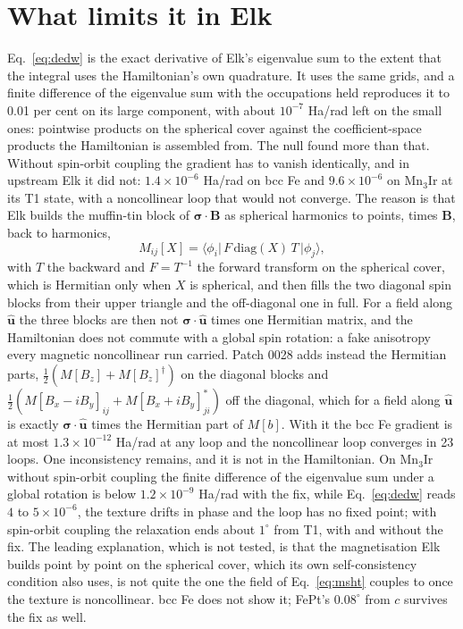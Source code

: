 \documentclass[11pt]{article}
\begin{document}
\section{What limits it in Elk}

Eq.~\eqref{eq:dedw} is the exact derivative of Elk's eigenvalue sum to the
extent that the integral uses the Hamiltonian's own quadrature. It uses the
same grids, and a finite difference of the eigenvalue sum with the occupations
held reproduces it to 0.01 per cent on its large component, with about
$10^{-7}$ Ha/rad left on the small ones: pointwise products on the spherical
cover against the coefficient-space products the Hamiltonian is assembled
from. The null found more than that. Without spin-orbit coupling the gradient
has to vanish identically, and in upstream Elk it did not: $1.4\times10^{-6}$
Ha/rad on bcc Fe and $9.6\times10^{-6}$ on Mn$_3$Ir at its T1 state, with a
noncollinear loop that would not converge. The reason is that Elk builds the
muffin-tin block of $\boldsymbol\sigma\cdot\mathbf B$ as spherical harmonics to
points, times $\mathbf B$, back to harmonics,
\begin{equation}
  M_{ij}[X]=\langle\phi_i|\,F\,\mathrm{diag}(X)\,T\,|\phi_j\rangle ,
  \label{eq:msht}
\end{equation}
with $T$ the backward and $F=T^{-1}$ the forward transform on the spherical
cover, which is Hermitian only when $X$ is spherical, and then fills the two
diagonal spin blocks from their upper triangle and the off-diagonal one in
full. For a field along $\hat{\mathbf u}$ the three blocks are then not
$\boldsymbol\sigma\cdot\hat{\mathbf u}$ times one Hermitian matrix, and the
Hamiltonian does not commute with a global spin rotation: a fake anisotropy
every magnetic noncollinear run carried. Patch 0028 adds instead the Hermitian
parts, $\tfrac12(M[B_z]+M[B_z]^\dagger)$ on the diagonal blocks and
$\tfrac12(M[B_x-iB_y]_{ij}+M[B_x+iB_y]_{ji}^*)$ off the diagonal, which for a
field along $\hat{\mathbf u}$ is exactly $\boldsymbol\sigma\cdot\hat{\mathbf u}$
times the Hermitian part of $M[b]$. With it the bcc Fe gradient is at most
$1.3\times10^{-12}$ Ha/rad at any loop and the noncollinear loop converges in
23 loops. One inconsistency remains, and it is not in the Hamiltonian. On
Mn$_3$Ir without spin-orbit coupling the finite difference of the eigenvalue
sum under a global rotation is below $1.2\times10^{-9}$ Ha/rad with the fix,
while Eq.~\eqref{eq:dedw} reads $4$ to $5\times10^{-6}$, the texture drifts
in phase and the loop has no fixed point; with spin-orbit coupling the
relaxation ends about $1^\circ$ from T1, with and without the fix. The leading
explanation, which is not tested, is that the magnetisation Elk builds point by
point on the spherical cover, which its own self-consistency condition also
uses, is not quite the one the field of Eq.~\eqref{eq:msht} couples to once the
texture is noncollinear. bcc Fe does not show it; FePt's $0.08^\circ$ from $c$
survives the fix as well.
\end{document}
